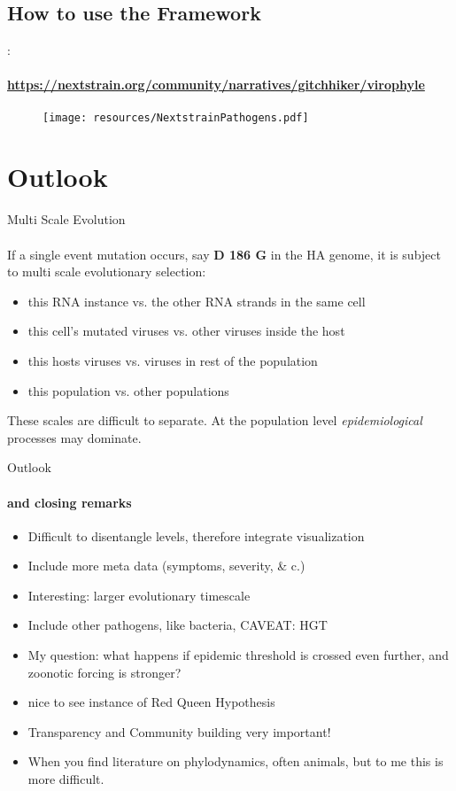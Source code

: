 \documentclass{beamer}
\begin{document}
\begin{darkframes}
\begin{frame}
    \subsection{How to use the Framework}
    \begin{frame}{\secname : \subsecname}
      \framesubtitle{\href{URL}{https://nextstrain.org/community/narratives/gitchhiker/virophyle}}
      \begin{figure}
        \texttt{[image: resources/NextstrainPathogens.pdf]}
        \caption{\footnotesize }
      \end{figure}
    \end{frame}

    \section{Outlook}

    \begin{frame}{Multi Scale Evolution}
      \framesubtitle{}
      If a single event mutation occurs, say \textbf{D 186 G} in the HA genome, it is subject to multi scale evolutionary selection:
      \begin{itemize}
        \item this RNA instance vs. the other RNA strands in the same cell
        \item this cell's mutated viruses vs. other viruses inside the host
        \item this hosts viruses vs. viruses in rest of the population
        \item this population vs. other populations
      \end{itemize}
      These scales are difficult to separate. At the population level \textit{epidemiological} processes may dominate.
    \end{frame}

    \begin{frame}{Outlook}
      \framesubtitle{and closing remarks}
      \begin{itemize}
        \item Difficult to disentangle levels, therefore integrate visualization
        \item Include more meta data (symptoms, severity, \& c.)
        \item Interesting: larger evolutionary timescale
        \item Include other pathogens, like bacteria, CAVEAT: HGT
        \item My question: what happens if epidemic threshold is crossed even further, and zoonotic forcing is stronger?
        \item nice to see instance of Red Queen Hypothesis
        \item Transparency and Community building very important!
        \item When you find literature on phylodynamics, often animals, but to me this is more difficult.
      \end{itemize}
    \end{frame}


\end{frame}
\end{darkframes}
\end{document}
